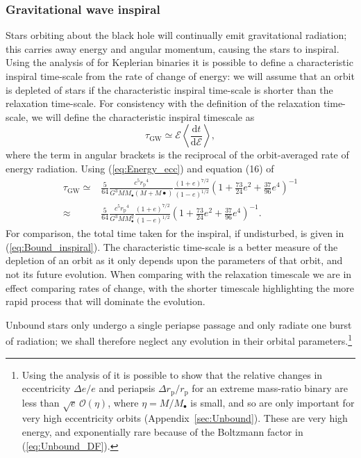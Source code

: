 \documentclass[useAMS,usedcolumn,usegraphicx,usenatbib]{mn2e}
\newcommand{\eqnref}[1]{(\ref{eq:#1})}
\newcommand{\apref}[1]{Appendix~\ref{sec:#1}}
\newcommand{\sub}[1]{\ensuremath{_\mathrm{#1}}}
\newcommand{\dd}{\ensuremath{\mathrm{d}}}
\newcommand{\diff}[2]{\ensuremath{\frac{\dd {#1}}{\dd {#2}}}}
\newcommand{\order}[1]{\ensuremath{\mathcal{O}({#1})}}
\begin{document}
\subsubsection{Gravitational wave inspiral}

Stars orbiting about the black hole will continually emit gravitational radiation; this carries away energy and angular momentum, causing the stars to inspiral. Using the analysis of \citet{Peters1963,Peters1964} for Keplerian binaries it is possible to define a characteristic inspiral time-scale from the rate of change of energy: we will assume that an orbit is depleted of stars if the characteristic inspiral time-scale is shorter than the relaxation time-scale. For consistency with the definition of the relaxation time-scale, we will define the characteristic inspiral timescale as~\citep{MiraldaEscude2000}
\begin{equation}
\tau\sub{GW} \simeq \mathcal{E}\left\langle\diff{t}{\mathcal{E}}\right\rangle,
\label{eq:tGW-def}
\end{equation}
where the term in angular brackets is the reciprocal of the orbit-averaged rate of energy radiation. Using \eqnref{Energy_ecc} and equation (16) of \citet{Peters1963}
\begin{align}
\tau\sub{GW} \simeq {} & \frac{5}{64}\frac{c^5r\sub{p}^4}{G^3MM_\bullet\left(M + M\bullet\right)}\frac{(1+e)^{7/2}}{(1-e)^{1/2}}\left(1+\frac{73}{24}e^2 + \frac{37}{96}e^4\right)^{-1} \\
 \approx {} & \frac{5}{64}\frac{c^5r\sub{p}^4}{G^3MM_\bullet^2}\frac{(1+e)^{7/2}}{(1-e)^{1/2}}\left(1+\frac{73}{24}e^2 + \frac{37}{96}e^4\right)^{-1}.
\end{align}
For comparison, the total time taken for the inspiral, if undisturbed, is given in \eqnref{Bound_inspiral}. The characteristic time-scale is a better measure of the depletion of an orbit as it only depends upon the parameters of that orbit, and not its future evolution. When comparing with the relaxation timescale we are in effect comparing rates of change, with the shorter timescale highlighting the more rapid process that will dominate the evolution.

Unbound stars only undergo a single periapse passage and only radiate one burst of radiation; we shall therefore neglect any evolution in their orbital parameters.\footnote{Using the analysis of \citet{Turner1977} it is possible to show that the relative changes in eccentricity $\Delta e / e$ and periapsis $\Delta r\sub{p} / r\sub{p}$ for an extreme mass-ratio binary are less than $\sqrt{e}\,\order{\eta}$, where $\eta = M/M_\bullet$ is small, and so are only important for very high eccentricity orbits (\apref{Unbound}). These are very high energy, and exponentially rare because of the Boltzmann factor in \eqnref{Unbound_DF}.}
\end{document}
